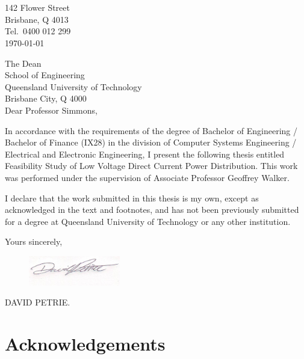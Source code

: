\newpage


\section*{}

\begin{flushright}
	142 Flower Street\\
	Brisbane, Q 4013\\
	Tel.\ 0400 012 299\\
	\medskip
	\today
\end{flushright}
\begin{flushleft}
  The Dean\\
  School of Engineering\\
  Queensland University of Technology\\
  Brisbane City, Q 4000\\
  \bigskip\bigskip
  Dear Professor Simmons,
\end{flushleft}

In accordance with the requirements of the degree of Bachelor of
Engineering / Bachelor of Finance (IX28) in the division of Computer Systems
Engineering / Electrical and Electronic Engineering, I present the
following thesis entitled Feasibility Study of Low Voltage Direct Current Power Distribution.  This work was performed under the supervision of Associate Professor Geoffrey Walker.

I declare that the work submitted in this thesis is my own, except as
acknowledged in the text and footnotes, and has not been previously
submitted for a degree at Queensland University of Technology or any other
institution.

\begin{flushright}
	Yours sincerely,\\
	\medskip
	\begin{figure}[H]
	\hfill\includegraphics[width = 40mm]{images/Signature}%
	\end{figure} 
	\medskip
	DAVID PETRIE.
\end{flushright}

\newpage

\section*{Acknowledgements}



